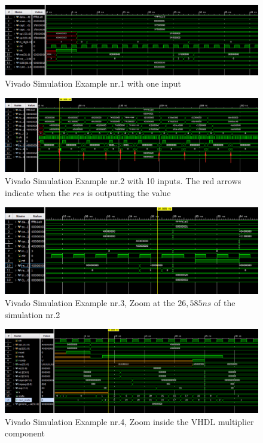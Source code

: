 \documentclass[]{IEEEtran}
\begin{document}
\begin{figure}[tb]
	\centering
	\includegraphics[scale=0.40]{figures/vivados1.png}
	\caption{Vivado Simulation Example nr.1 with one input}
	\label{fig:vivado_s1}
\end{figure}
\begin{figure}[tb]
	\centering
	\includegraphics[scale=0.38]{figures/vivados2.png}
	\caption{Vivado Simulation Example nr.2 with 10 inputs. The red arrows indicate when the $res$ is outputting the value}
	\label{fig:vivado_s2}
\end{figure}
\begin{figure}[tb]
	\centering
	\includegraphics[scale=0.46]{figures/vivados2detail.png}
	\caption{Vivado Simulation Example nr.3, Zoom at the $26,585ns$ of the simulation nr.2 }
	\label{fig:vivado_s2_detail}
\end{figure}
\begin{figure}[tb]
\centering
\includegraphics[scale=0.38]{figures/vivados3.png}
\caption{Vivado Simulation Example nr.4, Zoom inside the VHDL multiplier component }
\label{fig:vivado_s3}
\end{figure}
\end{document}
